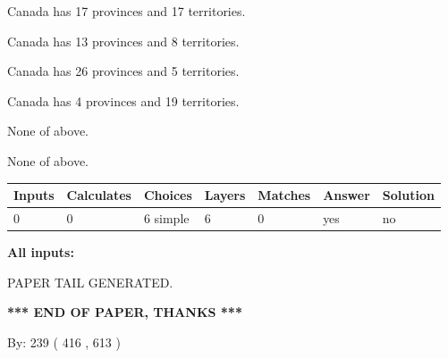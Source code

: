 \documentclass[12pt]{article}
\begin{document}
 
Canada has  17 provinces and  17 territories.
 
 
Canada has  13 provinces and  8 territories.
 
 
Canada has  26 provinces and  5 territories.
 
 
Canada has   4 provinces and  19 territories.
 
 
 None of above.
 
 
\noindent{}
 
 
 None of above.
 
 
\noindent{}
 
 
   
   
   
   
\noindent\begin{tabular}{|l|l|l|l|l|l|l|}
 \hline
Inputs & Calculates & Choices & Layers & Matches & Answer & Solution \\ \hline
 0  & 
 0  & 
 6
  simple  
  & 
 6  & 
 0  & 
  yes & 
  no 
  \\ \hline
 \end{tabular}
   
   
   
   
\noindent{}
   
   
   
   
\noindent\vspace{0.1in}\hspace{-0.08in} {\textbf{\Large{All inputs: }}}
   
   
   
   
   
   
 \vspace{0.2in}
 
   
   
\vspace{2.0in} PAPER TAIL GENERATED.
   
   
   
   
\vspace{1.0in} 
{\textbf{\large{ *** END OF PAPER, THANKS *** }}} 
   
   
\hspace{1.0in} By: 
 239 ( 416 ,  613 )
   
\end{document}

